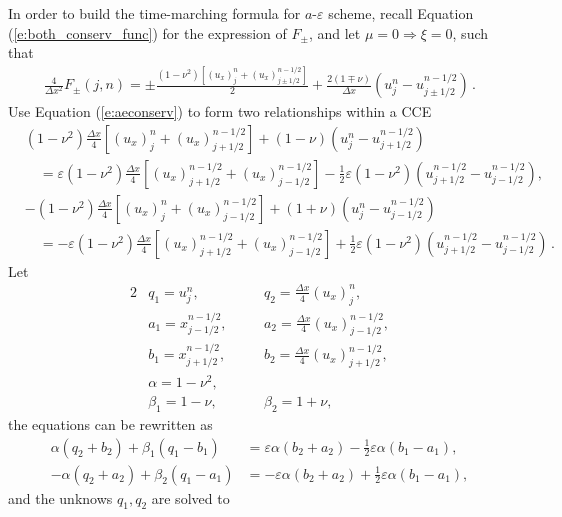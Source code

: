 \documentclass[11pt,dvips]{article}
\numberwithin{equation}{section}
\begin{document}
In order to build the time-marching formula for $a$-$\varepsilon$ scheme,
recall Equation (\ref{e:both_conserv_func}) for the expression of
$F_{\pm}$, and let $\mu=0\Rightarrow\xi=0$, such that
\begin{align*}
  \frac{4}{\Delta x^2}F_{\pm}(j,n)
    = \pm\frac{(1-\nu^2)[(u_x)_j^n+(u_x)_{j\pm1/2}^{n-1/2}]}{2}
    + \frac{2(1\mp\nu)}{\Delta x}(u_j^n-u_{j\pm1/2}^{n-1/2})\,.
\end{align*}
Use Equation (\ref{e:aeconserv}) to form two relationships within a CCE
\begin{align*}
  &(1-\nu^2)\frac{\Delta x}{4}[(u_x)_j^n+(u_x)_{j+1/2}^{n-1/2}]
    + (1-\nu)(u_j^n-u_{j+1/2}^{n-1/2}) \\
  &\quad = \varepsilon(1-\nu^2)\frac{\Delta x}{4}
           [(u_x)_{j+1/2}^{n-1/2}+(u_x)_{j-1/2}^{n-1/2}]
         - \frac{1}{2}
           \varepsilon(1-\nu^2)(u_{j+1/2}^{n-1/2}-u_{j-1/2}^{n-1/2}), \\
  &-(1-\nu^2)\frac{\Delta x}{4}[(u_x)_j^n+(u_x)_{j-1/2}^{n-1/2}]
    + (1+\nu)(u_j^n-u_{j-1/2}^{n-1/2}) \\
  &\quad = -\varepsilon(1-\nu^2)\frac{\Delta x}{4}
            [(u_x)_{j+1/2}^{n-1/2}+(u_x)_{j-1/2}^{n-1/2}]
          + \frac{1}{2}
            \varepsilon(1-\nu^2)(u_{j+1/2}^{n-1/2}-u_{j-1/2}^{n-1/2})\,.
\end{align*}
Let
\begin{alignat*}{2}
  &       q_1 = u_j^n,
  &\quad& q_2 = \frac{\Delta x}{4}(u_x)_j^n, \\
  &       a_1 = x_{j-1/2}^{n-1/2},
  &&      a_2 = \frac{\Delta x}{4}(u_x)_{j-1/2}^{n-1/2}, \\
  &       b_1 = x_{j+1/2}^{n-1/2},
  &&      b_2 = \frac{\Delta x}{4}(u_x)_{j+1/2}^{n-1/2}, \\
  &       \alpha = 1-\nu^2, && \\
  &       \beta_1 = 1-\nu,
  &&      \beta_2 = 1+\nu,
\end{alignat*}
the equations can be rewritten as
\begin{align*}
  \alpha(q_2+b_2) + \beta_1(q_1-b_1)
    &=   \varepsilon\alpha(b_2+a_2)
       - \frac{1}{2}\varepsilon\alpha(b_1-a_1), \\
  -\alpha(q_2+a_2) + \beta_2(q_1-a_1)
    &=  -\varepsilon\alpha(b_2+a_2)
       + \frac{1}{2}\varepsilon\alpha(b_1-a_1),
\end{align*}
and the unknows $q_1, q_2$ are solved to
\end{document}
